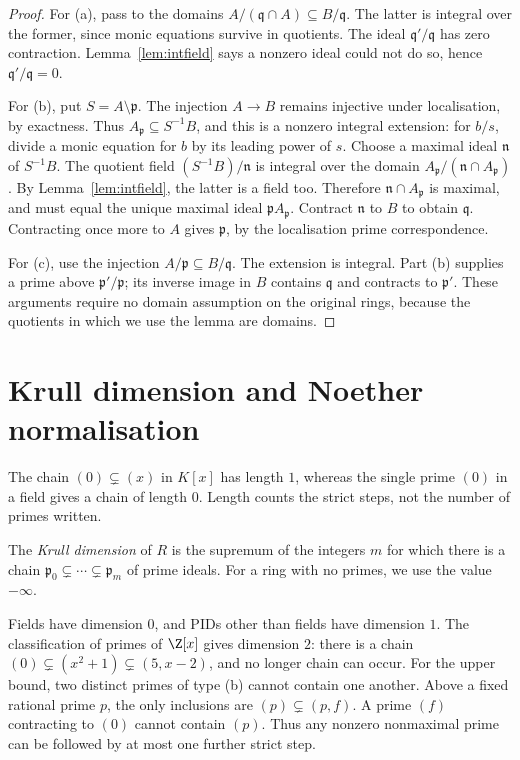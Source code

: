 \begin{proof}
For (a), pass to the domains $A/(\mathfrak q\cap A)\subseteq B/\mathfrak q$. The latter is integral over the former, since monic equations survive in quotients. The ideal $\mathfrak q'/\mathfrak q$ has zero contraction. Lemma~\ref{lem:intfield} says a nonzero ideal could not do so, hence $\mathfrak q'/\mathfrak q=0$.

For (b), put $S=A\setminus\mathfrak p$. The injection $A\to B$ remains injective under localisation, by exactness. Thus $A_{\mathfrak p}\subseteq S^{-1}B$, and this is a nonzero integral extension: for $b/s$, divide a monic equation for $b$ by its leading power of $s$. Choose a maximal ideal $\mathfrak n$ of $S^{-1}B$. The quotient field $(S^{-1}B)/\mathfrak n$ is integral over the domain
$A_{\mathfrak p}/(\mathfrak n\cap A_{\mathfrak p})$. By Lemma~\ref{lem:intfield}, the latter is a field too. Therefore $\mathfrak n\cap A_{\mathfrak p}$ is maximal, and must equal the unique maximal ideal $\mathfrak pA_{\mathfrak p}$. Contract $\mathfrak n$ to $B$ to obtain $\mathfrak q$. Contracting once more to $A$ gives $\mathfrak p$, by the localisation prime correspondence.

For (c), use the injection $A/\mathfrak p\subseteq B/\mathfrak q$. The extension is integral. Part (b) supplies a prime above $\mathfrak p'/\mathfrak p$; its inverse image in $B$ contains $\mathfrak q$ and contracts to $\mathfrak p'$. These arguments require no domain assumption on the original rings, because the quotients in which we use the lemma are domains.
\end{proof}

\section{Krull dimension and Noether normalisation}

The chain $(0)\subsetneq(x)$ in $K[x]$ has length $1$, whereas the single prime $(0)$ in a field gives a chain of length $0$. Length counts the strict steps, not the number of primes written.

\begin{definition}\label{def:krulldim}
The \emph{Krull dimension} of $R$ is the supremum of the integers $m$ for which there is a chain $\mathfrak p_0\subsetneq\cdots\subsetneq\mathfrak p_m$ of prime ideals. For a ring with no primes, we use the value $-\infty$.
\end{definition}

Fields have dimension $0$, and PIDs other than fields have dimension $1$. The classification of primes of $\Z[x]$ gives dimension $2$: there is a chain $(0)\subsetneq(x^2+1)\subsetneq(5,x-2)$, and no longer chain can occur. For the upper bound, two distinct primes of type (b) cannot contain one another. Above a fixed rational prime $p$, the only inclusions are $(p)\subsetneq(p,f)$. A prime $(f)$ contracting to $(0)$ cannot contain $(p)$. Thus any nonzero nonmaximal prime can be followed by at most one further strict step.

